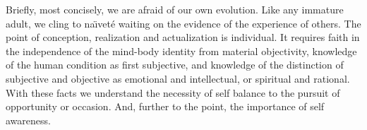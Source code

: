 Briefly, most concisely, we are afraid of our own evolution.  Like any
immature adult, we cling to na\"{\i}vet\'{e} waiting on the evidence
of the experience of others.  The point of conception, realization and
actualization is individual.  It requires faith in the independence of
the mind-body identity from material objectivity, knowledge of the
human condition as first subjective, and knowledge of the distinction
of subjective and objective as emotional and intellectual, or
spiritual and rational.  With these facts we understand the necessity
of self balance to the pursuit of opportunity or occasion.  And,
further to the point, the importance of self awareness.

\vfill
\bye

